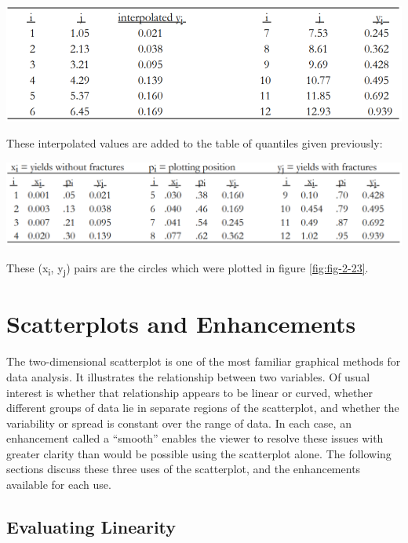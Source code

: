 \documentclass[]{book}
\begin{document}
\begin{center}\includegraphics[width=14in]{figures/2_B} \end{center}

These interpolated values are added to the table of quantiles given previously:

\begin{center}\includegraphics[width=15.86in]{figures/2_C} \end{center}

These (x\textsubscript{i}, y\textsubscript{j}) pairs are the circles which were plotted in figure \ref{fig:fig-2-23}.

\hypertarget{scatterplots-and-enhancements}{%
\section{Scatterplots and Enhancements}\label{scatterplots-and-enhancements}}

The two-dimensional scatterplot is one of the most familiar graphical methods for data analysis. It illustrates the relationship between two variables. Of usual interest is whether that relationship appears to be linear or curved, whether different groups of data lie in separate regions of the scatterplot, and whether the variability or spread is constant over the range of data. In each case, an enhancement called a ``smooth'' enables the viewer to resolve these issues with greater clarity than would be possible using the scatterplot alone. The following sections discuss these three uses of the scatterplot, and the enhancements available for each use.

\hypertarget{evaluating-linearity}{%
\subsection{Evaluating Linearity}\label{evaluating-linearity}}
\end{document}
